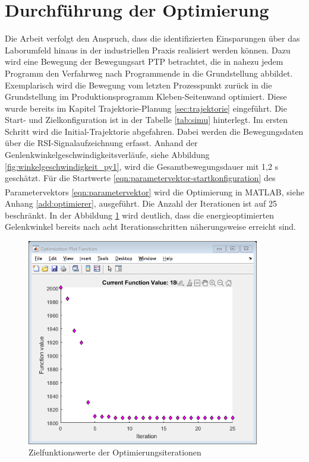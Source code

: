 \section{Durchführung der Optimierung}
Die Arbeit verfolgt den Anspruch, dass die identifizierten Einsparungen über das Laborumfeld hinaus in der industriellen Praxis realisiert werden können. Dazu wird eine Bewegung der Bewegungsart PTP betrachtet, die in nahezu jedem Programm den Verfahrweg nach Programmende in die Grundstellung abbildet. Exemplarisch wird die Bewegung vom letzten Prozesspunkt zurück in die Grundstellung im Produktionsprogramm  Kleben-Seitenwand  optimiert. Diese wurde bereits im Kapitel Trajektorie-Planung \ref{sec:trajektorie} eingeführt. Die Start- und Zielkonfiguration ist in der Tabelle \ref{tab:simu} hinterlegt.  Im ersten Schritt wird die Initial-Trajektorie abgefahren. Dabei werden die Bewegungsdaten über die RSI-Signalaufzeichnung erfasst. Anhand der Genlenkwinkelgeschwindigkeitsverläufe, siehe Abbildung \ref{fig:winkelgeschwindigkeit_py1}, wird die Gesamtbewegungsdauer mit 1,2 s geschätzt. Für die Startwerte \ref{eqn:parametervektor-startkonfiguration} des Parametervektors \ref{eqn:parametervektor} wird die Optimierung in MATLAB\textsuperscript{\textregistered}, siehe Anhang \ref{add:optimierer}, ausgeführt. Die Anzahl der Iterationen ist auf 25 beschränkt. In der Abbildung \ref{fig:funktionswerte-iteration} wird deutlich, dass die energieoptimierten Gelenkwinkel bereits nach acht Iterationsschritten näherungsweise erreicht sind.

\begin{figure}[tbph]
	\centering
	\includegraphics [width=4in]{images/optimization_01}
	\caption{Zielfunktionswerte der Optimierungsiterationen}
	\label{fig:funktionswerte-iteration}
\end{figure}

